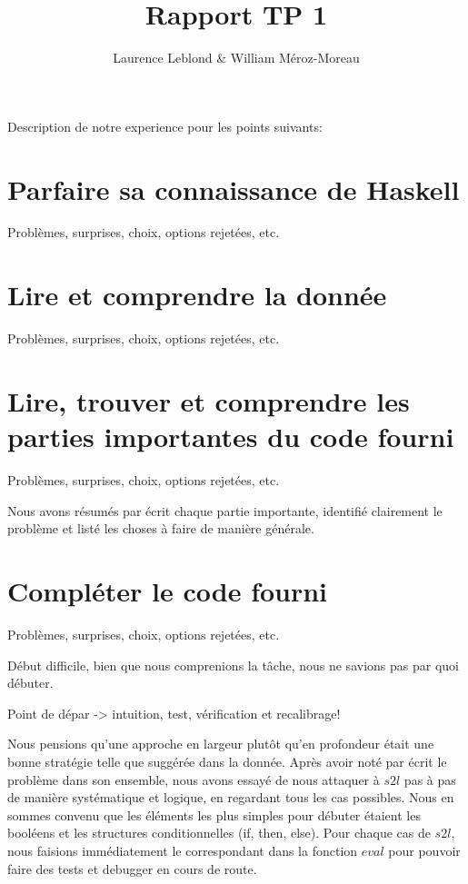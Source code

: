 \documentclass{article}
\title{Rapport TP 1}
\author {Laurence Leblond & William Méroz-Moreau}
\begin{document}
Description de notre experience pour les points suivants:

\section{Parfaire sa connaissance de Haskell}

Problèmes, surprises, choix, options rejetées, etc.


\section{Lire et comprendre la donnée}

Problèmes, surprises, choix, options rejetées, etc.

\section{Lire, trouver et comprendre les parties importantes du code fourni}

Problèmes, surprises, choix, options rejetées, etc.

Nous avons résumés par écrit chaque partie importante, identifié clairement le problème et listé les choses à faire de manière générale. 

\section{Compléter le code fourni}
Problèmes, surprises, choix, options rejetées, etc.

Début difficile, bien que nous comprenions la tâche, nous ne savions pas par quoi débuter.


Point de dépar -> intuition, test, vérification et recalibrage!


Nous pensions qu'une approche en largeur plutôt qu'en profondeur était une bonne stratégie telle que suggérée dans la donnée. Après avoir noté par écrit le problème dans son ensemble, nous avons essayé de nous attaquer à $s2l$ pas à pas de manière systématique et logique, en regardant tous les cas possibles. Nous en sommes convenu que les éléments les plus simples pour débuter étaient les booléens et les structures conditionnelles (if, then, else). Pour chaque cas de $s2l$, nous faisions immédiatement le correspondant dans la fonction $eval$ pour pouvoir faire des tests et debugger en cours de route.
\end{document}
